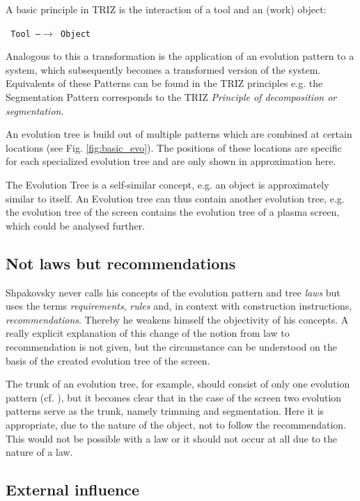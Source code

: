 \documentclass[11pt,a4paper]{article}
\begin{document}
A basic principle in TRIZ is the interaction of a tool and an (work) object:

\begin{center}\tt
  Tool \textrm{---}$\to$ Object
\end{center}

Analogous to this a transformation is the application of an evolution
pattern to a system, which subsequently becomes a transformed version of the
system. Equivalents of these Patterns can be found in the TRIZ principles
e.g. the Segmentation Pattern corresponds to the TRIZ \textit{Principle of
  decomposition or segmentation}.

An evolution tree is build out of multiple patterns which are combined at
certain locations (see Fig. \ref{fig:basic_evo}). The positions of these
locations are specific for each specialized evolution tree and are only shown
in approximation here.

The Evolution Tree is a self-similar concept, e.g. an object is approximately
similar to itself. An Evolution tree can thus contain another evolution tree,
e.g. the evolution tree of the screen contains the evolution tree of a plasma
screen, which could be analysed further.

\subsection{Not laws but recommendations}

Shpakovsky never calls his concepts of the evolution pattern and tree
\emph{laws} but uses the terms \emph{requirements}, \emph{rules} and, in
context with construction instructions, \emph{recommendations}. Thereby he
weakens himself the objectivity of his concepts. A really explicit explanation
of this change of the notion from law to recommendation is not given, but the
circumstance can be understood on the basis of the created evolution tree of
the screen.

The trunk of an evolution tree, for example, should consist of only one
evolution pattern (cf. \cite[p. 122f]{Shpakovsky2016}), but it becomes clear
that in the case of the screen two evolution patterns serve as the trunk,
namely trimming and segmentation. Here it is appropriate, due to the nature of
the object, not to follow the recommendation. This would not be possible with
a law or it should not occur at all due to the nature of a law.

\subsection{External influence}
\end{document}
